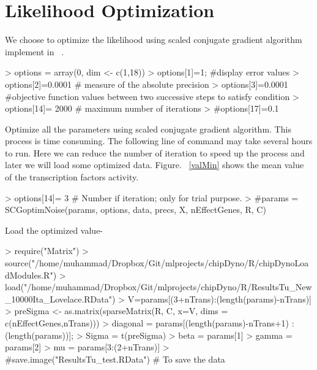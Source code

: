 \documentclass{article}
\begin{document}
\section{Likelihood Optimization}
We choose to optimize the likelihood using scaled conjugate gradient algorithm implement in  ~\cite{nabney:01}. 

\begin{Schunk}
\begin{Sinput}
> options = array(0, dim <- c(1,18))
> options[1]=1; #display error values
> options[2]=0.0001 # measure of the absolute precision
> options[3]=0.0001  #objective function values between two successive steps to satisfy condition
> options[14]= 2000  # maximum number of iterations
> #options[17]=0.1 
\end{Sinput}
\end{Schunk}

Optimize all the parameters using scaled conjugate gradient algorithm. This process is time consuming. The following line of command may take several hours to run. Here we can reduce the number of iteration to speed up the process and later we will load some optimized data. Figure. ~\ref{valMin} shows the mean value of the transcription factors activity.

\begin{Schunk}
\begin{Sinput}
> options[14]= 3 # Number if iteration; only for trial purpose.
> #params = SCGoptimNoise(params, options, data, precs, X, nEffectGenes, R, C)
\end{Sinput}
\end{Schunk}

Load the optimized value-
\begin{Schunk}
\begin{Sinput}
> require("Matrix")
> source("/home/muhammad/Dropbox/Git/mlprojects/chipDyno/R/chipDynoLoadModules.R")
> load("/home/muhammad/Dropbox/Git/mlprojects/chipDyno/R/ResultsTu_New_10000Ita_Lovelace.RData")
> V=params[(3+nTrans):(length(params)-nTrans)]
> preSigma <- as.matrix(sparseMatrix(R, C, x=V, dims = c(nEffectGenes,nTrans)))
> diagonal = params[(length(params)-nTrans+1) :(length(params))];
> Sigma = t(preSigma)%
> beta = params[1]
> gamma = params[2]
> mu = params[3:(2+nTrans)]
> #save.image("ResultsTu_test.RData") # To save the data 
\end{Sinput}
\end{Schunk}
\end{document}
